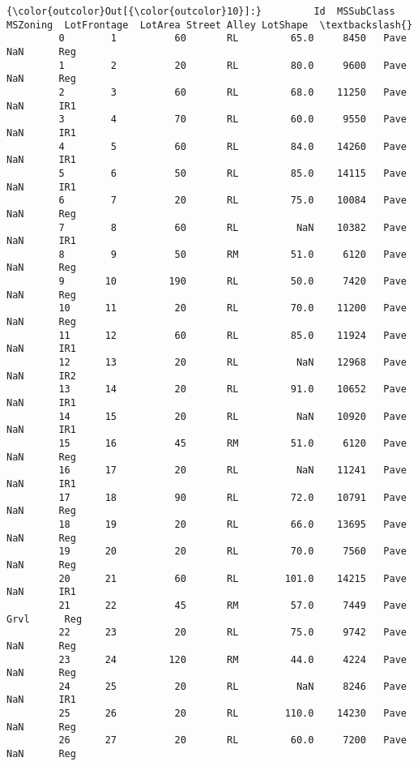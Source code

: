 \documentclass[11pt]{article}
\begin{document}
\begin{Verbatim}[commandchars=\\\{\}]
{\color{outcolor}Out[{\color{outcolor}10}]:}         Id  MSSubClass MSZoning  LotFrontage  LotArea Street Alley LotShape  \textbackslash{}
         0        1          60       RL         65.0     8450   Pave   NaN      Reg   
         1        2          20       RL         80.0     9600   Pave   NaN      Reg   
         2        3          60       RL         68.0    11250   Pave   NaN      IR1   
         3        4          70       RL         60.0     9550   Pave   NaN      IR1   
         4        5          60       RL         84.0    14260   Pave   NaN      IR1   
         5        6          50       RL         85.0    14115   Pave   NaN      IR1   
         6        7          20       RL         75.0    10084   Pave   NaN      Reg   
         7        8          60       RL          NaN    10382   Pave   NaN      IR1   
         8        9          50       RM         51.0     6120   Pave   NaN      Reg   
         9       10         190       RL         50.0     7420   Pave   NaN      Reg   
         10      11          20       RL         70.0    11200   Pave   NaN      Reg   
         11      12          60       RL         85.0    11924   Pave   NaN      IR1   
         12      13          20       RL          NaN    12968   Pave   NaN      IR2   
         13      14          20       RL         91.0    10652   Pave   NaN      IR1   
         14      15          20       RL          NaN    10920   Pave   NaN      IR1   
         15      16          45       RM         51.0     6120   Pave   NaN      Reg   
         16      17          20       RL          NaN    11241   Pave   NaN      IR1   
         17      18          90       RL         72.0    10791   Pave   NaN      Reg   
         18      19          20       RL         66.0    13695   Pave   NaN      Reg   
         19      20          20       RL         70.0     7560   Pave   NaN      Reg   
         20      21          60       RL        101.0    14215   Pave   NaN      IR1   
         21      22          45       RM         57.0     7449   Pave  Grvl      Reg   
         22      23          20       RL         75.0     9742   Pave   NaN      Reg   
         23      24         120       RM         44.0     4224   Pave   NaN      Reg   
         24      25          20       RL          NaN     8246   Pave   NaN      IR1   
         25      26          20       RL        110.0    14230   Pave   NaN      Reg   
         26      27          20       RL         60.0     7200   Pave   NaN      Reg   

\end{Verbatim}
\end{document}
